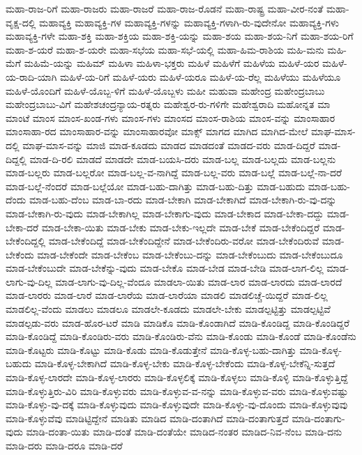 {ಮಹಾ-ರಾಜ-ರಿಗೆ
ಮಹಾ-ರಾಜರು
ಮಹಾ-ರಾಜರೆ
ಮಹಾ-ರಾಜ-ರೊಡನೆ
ಮಹಾ-ರಾಷ್ಟ್ರ
ಮಹಾ-ವೀರ-ನಂತೆ
ಮಹಾ-ವೃಕ್ಷ-ದಲ್ಲಿ
ಮಹಾವ್ಯಕ್ತಿ
ಮಹಾವ್ಯಕ್ತಿ-ಗಳ
ಮಹಾವ್ಯಕ್ತಿ-ಗಳನ್ನು
ಮಹಾವ್ಯಕ್ತಿ-ಗಳಾಗಿ-ರು-ವುದೇನೋ
ಮಹಾವ್ಯಕ್ತಿ-ಗಳು
ಮಹಾವ್ಯಕ್ತಿ-ಗಳೇ
ಮಹಾ-ಶಕ್ತಿ
ಮಹಾ-ಶಕ್ತಿಯ
ಮಹಾ-ಶಕ್ತಿ-ಯನ್ನು
ಮಹಾ-ಶಯ
ಮಹಾ-ಶಯ-ನಿಗೆ
ಮಹಾ-ಶಯ-ರಿಗೆ
ಮಹಾ-ಶ-ಯರೆ
ಮಹಾ-ಶ-ಯರೇ
ಮಹಾ-ಸಭೆಯ
ಮಹಾ-ಸಭೆ-ಯಲ್ಲಿ
ಮಹಾ-ಹಿಮ-ರಾಶಿಯ
ಮಹಿ-ಮನು
ಮಹಿ-ಮೆಗೆ
ಮಹಿಮೆ-ಯನ್ನು
ಮಹಿಮ್
ಮಹಿಳಾ
ಮಹಿಳಾ-ಭಕ್ತರು
ಮಹಿಳೆ
ಮಹಿಳೆಗೆ
ಮಹಿಳೆಯ
ಮಹಿಳೆ-ಯರ
ಮಹಿಳೆ-ಯ-ರಾದಿ-ಯಾಗಿ
ಮಹಿಳೆ-ಯ-ರಿಗೆ
ಮಹಿಳೆ-ಯರು
ಮಹಿಳೆ-ಯರೂ
ಮಹಿಳೆ-ಯ-ರೆಲ್ಲ
ಮಹಿಳೆಯು
ಮಹಿಳೆಯೂ
ಮಹಿಳೆ-ಯೊಂದಿಗೆ
ಮಹಿಳೆ-ಯೊಬ್ಬ-ಳಿಗೆ
ಮಹಿಳೆ-ಯೊಬ್ಬಳು
ಮಹೀ
ಮಹುವಾ
ಮಹೇಂದ್ರ
ಮಹೇಂದ್ರಬಾಬು
ಮಹೇಂದ್ರಬಾಬು-ವಿಗೆ
ಮಹೇಶಚಂದ್ರನ್ಯಾಯ-ರತ್ನರು
ಮಹೇಶ್ವರ-ರು-ಗಳಿಗೇ
ಮಹೇಶ್ವರಾದಿ
ಮಹೋನ್ನತ
ಮಾ
ಮಾಂಟೆ
ಮಾಂಸ
ಮಾಂಸ-ಖಂಡ-ಗಳು
ಮಾಂಸ-ಗಳು
ಮಾಂಸದ
ಮಾಂಸ-ರಾಶಿಯ
ಮಾಂಸ-ವನ್ನು
ಮಾಂಸಾಹಾರ
ಮಾಂಸಾಹಾ-ರದ
ಮಾಂಸಾಹಾರ-ವನ್ನು
ಮಾಂಸಾಹಾರವೋ
ಮಾಕ್ಸ್
ಮಾಗದ
ಮಾಗಿದ
ಮಾಗಿದ-ಮೇಲೆ
ಮಾಘ-ಮಾಸ-ದಲ್ಲಿ
ಮಾಘ-ಮಾಸ-ವನ್ನು
ಮಾಜಿ
ಮಾಡ-ಕೂಡದು
ಮಾಡದ
ಮಾಡದಂತೆ
ಮಾಡದ-ವರು
ಮಾಡ-ದಿದ್ದರೆ
ಮಾಡ-ದಿದ್ದಲ್ಲಿ
ಮಾಡ-ದಿ-ರಲಿ
ಮಾಡದೆ
ಮಾಡದೇ
ಮಾಡ-ಬಯಸಿ-ದರು
ಮಾಡ-ಬಲ್ಲ
ಮಾಡ-ಬಲ್ಲದು
ಮಾಡ-ಬಲ್ಲನು
ಮಾಡ-ಬಲ್ಲರು
ಮಾಡ-ಬಲ್ಲರೋ
ಮಾಡ-ಬಲ್ಲ-ವ-ನಾಗಿದ್ದೆ
ಮಾಡ-ಬಲ್ಲ-ವರು
ಮಾಡ-ಬಲ್ಲೆ
ಮಾಡ-ಬಲ್ಲೆ-ನಾ-ದರೆ
ಮಾಡ-ಬಲ್ಲೆ-ನೆಂದರೆ
ಮಾಡ-ಬಲ್ಲೆಯೋ
ಮಾಡ-ಬಹು-ದಾಗಿತ್ತು
ಮಾಡ-ಬಹು-ದಿತ್ತು
ಮಾಡ-ಬಹುದು
ಮಾಡ-ಬಹು-ದೆಂದು
ಮಾಡ-ಬಹು-ದೆಂಬ
ಮಾಡ-ಬಾ-ರದು
ಮಾಡ-ಬೇಕಾಗಿ
ಮಾಡ-ಬೇಕಾಗಿದೆ
ಮಾಡ-ಬೇಕಾಗಿ-ರು-ವು-ದನ್ನು
ಮಾಡ-ಬೇಕಾಗಿ-ರು-ವುದು
ಮಾಡ-ಬೇಕಾಗಿಲ್ಲ
ಮಾಡ-ಬೇಕಾಗು-ವುದು
ಮಾಡ-ಬೇಕಾದ
ಮಾಡ-ಬೇಕಾ-ದದ್ದು
ಮಾಡ-ಬೇಕಾ-ದರೆ
ಮಾಡ-ಬೇಕಾ-ಯಿತು
ಮಾಡ-ಬೇಕು
ಮಾಡ-ಬೇಕು-ಇಲ್ಲದೇ
ಮಾಡ-ಬೇಕೆ
ಮಾಡ-ಬೇಕೆಂದಿದ್ದರೆ
ಮಾಡ-ಬೇಕೆಂದಿದ್ದಲ್ಲಿ
ಮಾಡ-ಬೇಕೆಂದಿದ್ದೆ
ಮಾಡ-ಬೇಕೆಂದಿದ್ದೇನೆ
ಮಾಡ-ಬೇಕೆಂದಿರು-ವರೋ
ಮಾಡ-ಬೇಕೆಂದಿರುವೆ
ಮಾಡ-ಬೇಕೆಂದು
ಮಾಡ-ಬೇಕೆಂದೇ
ಮಾಡ-ಬೇಕೆಂಬ
ಮಾಡ-ಬೇಕೆಂಬು-ದನ್ನು
ಮಾಡ-ಬೇಕೆಂಬುದು
ಮಾಡ-ಬೇಕೆಂಬುದೂ
ಮಾಡ-ಬೇಕೆಂಬುದೇ
ಮಾಡ-ಬೇಕೆನ್ನು-ವುದು
ಮಾಡ-ಬೇಕೊ
ಮಾಡ-ಬೇಡ
ಮಾಡ-ಬೇಡಿ
ಮಾಡ-ಲಾಗ-ಲಿಲ್ಲ
ಮಾಡ-ಲಾಗು-ವು-ದಿಲ್ಲ
ಮಾಡ-ಲಾಗು-ವು-ದಿಲ್ಲ-ವೆಂದೂ
ಮಾಡಲಾ-ಯಿತು
ಮಾಡ-ಲಾರ
ಮಾಡ-ಲಾರದು
ಮಾಡ-ಲಾರದೆ
ಮಾಡ-ಲಾರರು
ಮಾಡ-ಲಾರೆ
ಮಾಡ-ಲಾರೆಯ
ಮಾಡ-ಲಾರೆಯಾ
ಮಾಡಲಿ
ಮಾಡಲಿಚ್ಚೆ-ಯಿದ್ದರೆ
ಮಾಡ-ಲಿಲ್ಲ
ಮಾಡಲಿಲ್ಲ-ವೆಂದು
ಮಾಡಲು
ಮಾಡಲೂ
ಮಾಡಲೇ-ಕೂಡದು
ಮಾಡಲೇ-ಬೇಕು
ಮಾಡಲ್ಪಟ್ಟಿತ್ತು
ಮಾಡಲ್ಪಟ್ಟಿವೆ
ಮಾಡಲ್ಪಡು-ವರು
ಮಾಡ-ಹೊರ-ಟರೆ
ಮಾಡಿ
ಮಾಡಿಕೊ
ಮಾಡಿ-ಕೊಂಡಾಗಿದೆ
ಮಾಡಿ-ಕೊಂಡಿದ್ದ
ಮಾಡಿ-ಕೊಂಡಿದ್ದರೆ
ಮಾಡಿ-ಕೊಂಡಿದ್ದೆ
ಮಾಡಿ-ಕೊಂಡಿರು-ವರು
ಮಾಡಿ-ಕೊಂಡಿರು-ವೆನು
ಮಾಡಿ-ಕೊಂಡು
ಮಾಡಿ-ಕೊಂಡೆ
ಮಾಡಿ-ಕೊಂಡೆನು
ಮಾಡಿ-ಕೊಟ್ಟರು
ಮಾಡಿ-ಕೊಟ್ಟು
ಮಾಡಿ-ಕೊಡು
ಮಾಡಿ-ಕೊಡುತ್ತೇನೆ
ಮಾಡಿ-ಕೊಳ್ಳ-ಬಹು-ದಾಗಿತ್ತು
ಮಾಡಿ-ಕೊಳ್ಳ-ಬಹುದು
ಮಾಡಿ-ಕೊಳ್ಳ-ಬೇಕಾಗಿದೆ
ಮಾಡಿ-ಕೊಳ್ಳ-ಬೇಕು
ಮಾಡಿ-ಕೊಳ್ಳ-ಬೇಕೆಂದು
ಮಾಡಿ-ಕೊಳ್ಳ-ಬೇಕೆನ್ನಿ-ಸುತ್ತದೆ
ಮಾಡಿ-ಕೊಳ್ಳ-ಲಾರದೇ
ಮಾಡಿ-ಕೊಳ್ಳ-ಲಾರರು
ಮಾಡಿ-ಕೊಳ್ಳಲಿಕ್ಕೆ
ಮಾಡಿ-ಕೊಳ್ಳಲು
ಮಾಡಿ-ಕೊಳ್ಳಿ
ಮಾಡಿ-ಕೊಳ್ಳುತ್ತಿದ್ದೆ
ಮಾಡಿ-ಕೊಳ್ಳುತ್ತಿರು-ವಿರಿ
ಮಾಡಿ-ಕೊಳ್ಳುವರು
ಮಾಡಿ-ಕೊಳ್ಳುವ-ವ-ನನ್ನು
ಮಾಡಿ-ಕೊಳ್ಳುವ-ವರು
ಮಾಡಿ-ಕೊಳ್ಳುವಷ್ಟು
ಮಾಡಿ-ಕೊಳ್ಳು-ವು-ದಕ್ಕೆ
ಮಾಡಿ-ಕೊಳ್ಳುವುದು
ಮಾಡಿ-ಕೊಳ್ಳುವುದೇ
ಮಾಡಿ-ಕೊಳ್ಳು-ವು-ದೊಂದು
ಮಾಡಿ-ಕೊಳ್ಳುವುವು
ಮಾಡಿ-ಕೊಳ್ಳುವೆವು
ಮಾಡಿಟ್ಟಿದ್ದೇನೆ
ಮಾಡಿತು
ಮಾಡಿದ
ಮಾಡಿ-ದಂತಾಗಿದೆ
ಮಾಡಿ-ದಂತಾಗುತ್ತದೆ
ಮಾಡಿ-ದಂತಾಗು-ವುದು
ಮಾಡಿ-ದಂತಾ-ಯಿತು
ಮಾಡಿ-ದಂತೆ
ಮಾಡಿ-ದಂತೆಯೇ
ಮಾಡಿದ-ನಂತರ
ಮಾಡಿದ-ನಿವ-ನೆಂಬ
ಮಾಡಿ-ದನು
ಮಾಡಿ-ದರು
ಮಾಡಿ-ದರೂ
ಮಾಡಿ-ದರೆ
}
